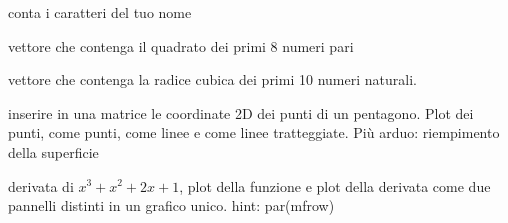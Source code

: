 \documentclass[onecolumn,12pt]{book}
\begin{document}
\begin{shaded}
\begin{description}
 \item{}conta i caratteri del tuo nome
\item{} vettore che contenga il quadrato dei primi 8 numeri pari
\item{}vettore che contenga la radice cubica dei primi 10 numeri naturali.
\item{}inserire in una matrice le coordinate 2D dei punti di un pentagono. Plot dei punti, come punti, come linee e come linee tratteggiate. Pi\`u arduo: riempimento della superficie
\item{}derivata di $x^3+x^2+2x+1$, plot della funzione e plot della derivata come due pannelli distinti in un grafico unico. hint: par(mfrow)
\end{description}
\end{shaded}
\end{document}
